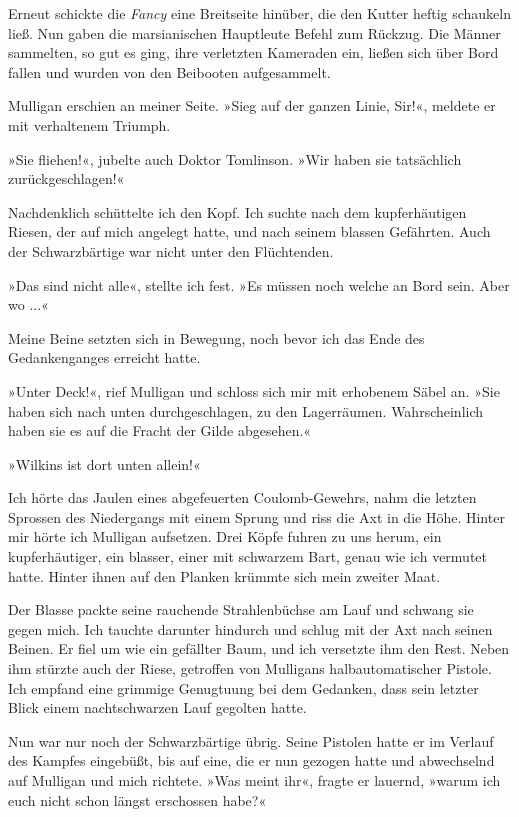 Erneut schickte die \emph{Fancy} eine Breitseite hinüber, die den
Kutter heftig schaukeln ließ. Nun gaben die marsianischen
Hauptleute Befehl zum Rückzug. Die Männer sammelten, so gut es
ging, ihre verletzten Kameraden ein, ließen sich über Bord fallen
und wurden von den Beibooten aufgesammelt.

Mulligan erschien an meiner Seite. »Sieg auf der ganzen Linie,
Sir!«, meldete er mit verhaltenem Triumph.

»Sie fliehen!«, jubelte auch Doktor Tomlinson. »Wir haben sie
tatsächlich zurückgeschlagen!«

Nachdenklich schüttelte ich den Kopf. Ich suchte nach dem
kupferhäutigen Riesen, der auf mich angelegt hatte, und nach seinem
blassen Gefährten. Auch der Schwarzbärtige war nicht unter den
Flüchtenden.

»Das sind nicht alle«, stellte ich fest. »Es müssen noch welche an
Bord sein. Aber wo ...«

Meine Beine setzten sich in Bewegung, noch bevor ich das Ende des
Gedankenganges erreicht hatte.

»Unter Deck!«, rief Mulligan und schloss sich mir mit erhobenem
Säbel an. »Sie haben sich nach unten durchgeschlagen, zu den
Lagerräumen. Wahrscheinlich haben sie es auf die Fracht der Gilde
abgesehen.«

»Wilkins ist dort unten allein!«

Ich hörte das Jaulen eines abgefeuerten Coulomb-Gewehrs, nahm die
letzten Sprossen des Niedergangs mit einem Sprung und riss die Axt
in die Höhe. Hinter mir hörte ich Mulligan aufsetzen. Drei Köpfe
fuhren zu uns herum, ein kupferhäutiger, ein blasser, einer mit
schwarzem Bart, genau wie ich vermutet hatte. Hinter ihnen auf den
Planken krümmte sich mein zweiter Maat.

Der Blasse packte seine rauchende Strahlenbüchse am Lauf und
schwang sie gegen mich. Ich tauchte darunter hindurch und schlug
mit der Axt nach seinen Beinen. Er fiel um wie ein gefällter Baum,
und ich versetzte ihm den Rest. Neben ihm stürzte auch der Riese,
getroffen von Mulligans halbautomatischer Pistole. Ich empfand eine
grimmige Genugtuung bei dem Gedanken, dass sein letzter Blick einem
nachtschwarzen Lauf gegolten hatte.

Nun war nur noch der Schwarzbärtige übrig. Seine Pistolen hatte er
im Verlauf des Kampfes eingebüßt, bis auf eine, die er nun gezogen
hatte und abwechselnd auf Mulligan und mich richtete. »Was meint
ihr«, fragte er lauernd, »warum ich euch nicht schon längst
erschossen habe?«

